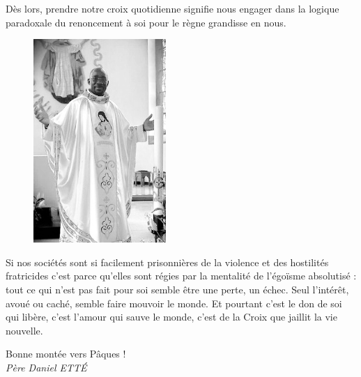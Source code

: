 Dès lors,
prendre notre croix quotidienne signifie nous engager dans la logique paradoxale du renoncement à soi pour le règne grandisse en nous.
\begin{figure}
\vspace{-0.5cm}
	\includegraphics[scale=1.2]{standing_daniel.png}
\end{figure}
Si nos sociétés sont si facilement prisonnières de la violence et des hostilités fratricides c’est parce qu’elles sont régies par la mentalité de l’égoïsme absolutisé : tout ce qui n’est pas fait pour soi semble être une perte, un échec. Seul l’intérêt, avoué ou caché, semble faire mouvoir le monde. Et pourtant c’est le don de 
soi qui libère, c’est l’amour qui sauve le monde, c’est de la Croix que jaillit la vie nouvelle.                                                                                                                                                                

\begin{flushright}
Bonne montée vers Pâques !\\
\textit{Père  Daniel  ETTÉ}
\end{flushright}
